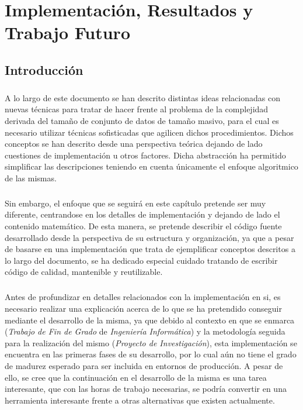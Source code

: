 \documentclass{subfiles}
\begin{document}
  \chapter{Implementación, Resultados y Trabajo Futuro}
  \label{chap:implementation}

    \section{Introducción}
    \label{sec:implementation_intro}

      \paragraph{}
      A lo largo de este documento se han descrito distintas ideas relacionadas con nuevas técnicas para tratar de hacer frente al problema de la complejidad derivada del tamaño de conjunto de datos de tamaño masivo, para el cual es necesario utilizar técnicas sofisticadas que agilicen dichos procedimientos. Dichos conceptos se han descrito desde una perspectiva teórica dejando de lado cuestiones de implementación u otros factores. Dicha abstracción ha permitido simplificar las descripciones teniendo en cuenta únicamente el enfoque algoritmico de las mismas.

      \paragraph{}
      Sin embargo, el enfoque que se seguirá en este capítulo pretende ser muy diferente, centrandose en los detalles de implementación y dejando de lado el contenido matemático. De esta manera, se pretende describir el código fuente desarrollado desde la perspectiva de su estructura y organización, ya que a pesar de basarse en una implementación que trata de ejemplificar conceptos descritos a lo largo del documento, se ha dedicado especial cuidado tratando de escribir código de calidad, mantenible y reutilizable.

      \paragraph{}
      Antes de profundizar en detalles relacionados con la implementación en si, es necesario realizar una explicación acerca de lo que se ha pretendido conseguir mediante el desarrollo de la misma, ya que debido al contexto en que se enmarca (\emph{Trabajo de Fin de Grado} de \emph{Ingeniería Informática}) y la metodología seguida para la realización  del mismo (\emph{Proyecto de Investigación}), esta implementación se encuentra en las primeras fases de su desarrollo, por lo cual aún no tiene el grado de madurez esperado para ser incluida en entornos de producción. A pesar de ello, se cree que la continuación en el desarrollo de la misma es una tarea interesante, que con las horas de trabajo necesarias, se podría convertir en una herramienta interesante frente a otras alternativas que existen actualmente.
\end{document}
